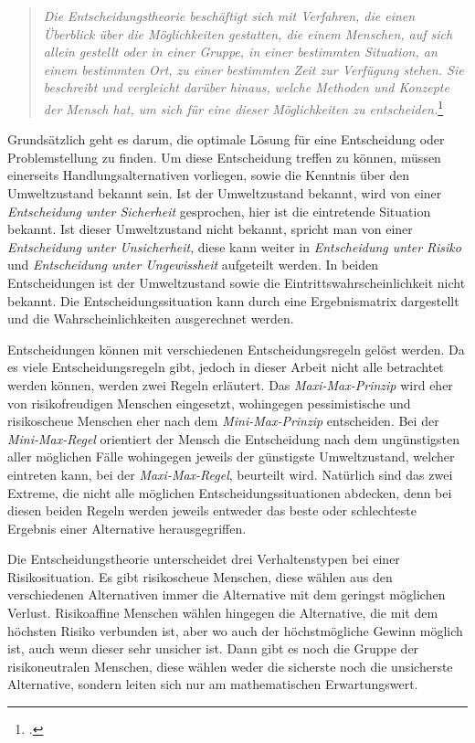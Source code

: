\begin{quote}
	\textit{\glqq Die Entscheidungstheorie beschäftigt sich mit Verfahren, die einen Überblick über die Möglichkeiten gestatten, die einem Menschen, auf sich allein gestellt oder in einer Gruppe, in einer bestimmten Situation, an einem bestimmten Ort, zu einer bestimmten Zeit zur Verfügung stehen. Sie beschreibt und vergleicht darüber hinaus, welche Methoden und Konzepte der Mensch hat, um sich für eine dieser Möglichkeiten zu entscheiden.\grqq}\footcite[S. 1]{wessler}
\end{quote}

Grundsätzlich geht es darum, die optimale Lösung für eine Entscheidung oder Problemstellung zu finden. Um diese Entscheidung treffen zu können, müssen einerseits Handlungsalternativen vorliegen, sowie die Kenntnis über den Umweltzustand bekannt sein. Ist der Umweltzustand bekannt, wird von einer \textit{Entscheidung unter Sicherheit} gesprochen, hier ist die eintretende Situation bekannt. Ist dieser Umweltzustand nicht bekannt, spricht man von einer \textit{Entscheidung unter Unsicherheit}, diese kann weiter in \textit{Entscheidung unter Risiko} und \textit{Entscheidung unter Ungewissheit} aufgeteilt werden. In beiden Entscheidungen ist der Umweltzustand sowie die Eintrittswahrscheinlichkeit nicht bekannt. Die Entscheidungssituation kann durch eine Ergebnismatrix dargestellt und die Wahrscheinlichkeiten ausgerechnet werden.

Entscheidungen können mit verschiedenen Entscheidungsregeln gelöst werden. Da es viele Entscheidungsregeln gibt, jedoch in dieser Arbeit nicht alle betrachtet werden können, werden zwei Regeln erläutert. Das \textit{Maxi-Max-Prinzip} wird eher von risikofreudigen Menschen eingesetzt, wohingegen pessimistische und risikoscheue Menschen eher nach dem \textit{Mini-Max-Prinzip} entscheiden. Bei der \textit{Mini-Max-Regel} orientiert der Mensch die Entscheidung nach dem ungünstigsten aller möglichen Fälle wohingegen jeweils der günstigste Umweltzustand, welcher eintreten kann, bei der \textit{Maxi-Max-Regel}, beurteilt wird.
Natürlich sind das zwei Extreme, die nicht alle möglichen Entscheidungssituationen abdecken, denn bei diesen beiden Regeln werden jeweils entweder das beste oder schlechteste Ergebnis einer Alternative herausgegriffen.

Die Entscheidungstheorie unterscheidet drei Verhaltenstypen bei einer Risikosituation. Es gibt risikoscheue Menschen, diese wählen aus den verschiedenen Alternativen immer die Alternative mit dem geringst möglichen  Verlust. Risikoaffine Menschen wählen hingegen die Alternative, die mit dem höchsten Risiko verbunden ist, aber wo auch der höchstmögliche Gewinn möglich ist, auch wenn dieser sehr unsicher ist. Dann gibt es noch die Gruppe der risikoneutralen Menschen, diese wählen weder die sicherste noch die unsicherste Alternative, sondern leiten sich nur am mathematischen Erwartungswert.

